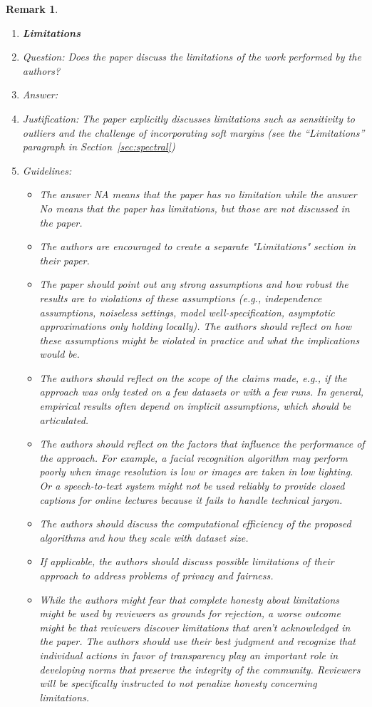 \documentclass{article}
\newtheorem{remark}{Remark}
\begin{document}
\begin{remark}
\begin{enumerate}
\item {\bf Limitations}
    \item[] Question: Does the paper discuss the limitations of the work performed by the authors?
    \item[] Answer: \answerYes{}
    \item[] Justification: The paper explicitly discusses limitations such as sensitivity to outliers and the challenge of incorporating soft margins (see the ``Limitations'' paragraph in Section~\ref{sec:spectral})
    \item[] Guidelines:
    \begin{itemize}
        \item The answer NA means that the paper has no limitation while the answer No means that the paper has limitations, but those are not discussed in the paper. 
        \item The authors are encouraged to create a separate "Limitations" section in their paper.
        \item The paper should point out any strong assumptions and how robust the results are to violations of these assumptions (e.g., independence assumptions, noiseless settings, model well-specification, asymptotic approximations only holding locally). The authors should reflect on how these assumptions might be violated in practice and what the implications would be.
        \item The authors should reflect on the scope of the claims made, e.g., if the approach was only tested on a few datasets or with a few runs. In general, empirical results often depend on implicit assumptions, which should be articulated.
        \item The authors should reflect on the factors that influence the performance of the approach. For example, a facial recognition algorithm may perform poorly when image resolution is low or images are taken in low lighting. Or a speech-to-text system might not be used reliably to provide closed captions for online lectures because it fails to handle technical jargon.
        \item The authors should discuss the computational efficiency of the proposed algorithms and how they scale with dataset size.
        \item If applicable, the authors should discuss possible limitations of their approach to address problems of privacy and fairness.
        \item While the authors might fear that complete honesty about limitations might be used by reviewers as grounds for rejection, a worse outcome might be that reviewers discover limitations that aren't acknowledged in the paper. The authors should use their best judgment and recognize that individual actions in favor of transparency play an important role in developing norms that preserve the integrity of the community. Reviewers will be specifically instructed to not penalize honesty concerning limitations.
    \end{itemize}


\end{enumerate}
\end{remark}
\end{document}
